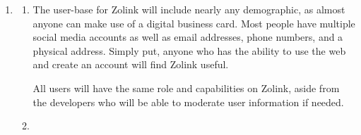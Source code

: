\documentclass[12pt]{article}%
\begin{document}
\clearpage
\begin{enumerate}[resume]
    \item 
        \begin{enumerate}
            \item The user-base for Zolink will include nearly any demographic, as almost anyone can make use of a digital business card. Most people have multiple social media accounts as well as email addresses, phone numbers, and a physical address. Simply put, anyone who has the ability to use the web and create an account will find Zolink useful. 
            
            All users will have the same role and capabilities on Zolink, aside from the developers who will be able to moderate user information if needed.
            
            \item
        \end{enumerate}
\end{enumerate}
\end{document}
